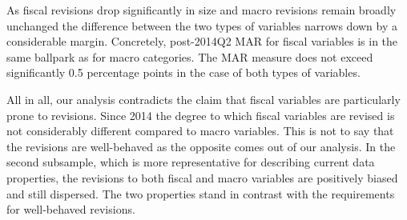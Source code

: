 As fiscal revisions drop significantly in size and macro revisions remain broadly unchanged the difference between the two types of variables narrows down by a considerable margin. Concretely, post-2014Q2 MAR for fiscal variables is in the same ballpark as for macro categories. The MAR measure does not exceed significantly 0.5 percentage points in the case of both types of variables. 

All in all, our analysis contradicts the claim that fiscal variables are particularly prone to revisions. Since 2014 the degree to which fiscal variables are revised is not considerably different compared to macro variables. This is not to say that the revisions are well-behaved as the opposite comes out of our analysis. In the second subsample, which is more representative for describing current data properties, the revisions to both fiscal and macro variables are positively biased and still dispersed. The two properties stand in contrast with the requirements for well-behaved revisions.